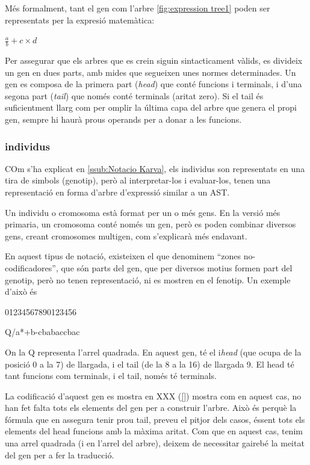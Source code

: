 \documentclass[titlepage,a4paper,12pt]{book}
\begin{document}
Més formalment, tant el gen com l'arbre \ref{fig:expression tree1} poden ser
representats per la expresió matemàtica:

	$\frac{a}{b}+c \times d$

Per assegurar que els arbres que es crein siguin sintacticament vàlids,
es divideix un gen en dues parts, amb mides que segueixen unes normes
determinades.  Un gen es composa de la primera part (\emph{head}) que conté
funcions i terminals, i d'una segona part (\emph{tail}) que només conté
terminals (aritat zero). Si el tail és suficientment llarg com per omplir la
última capa del arbre que genera el propi gen, sempre hi haurà prous operands
per a donar a les funcions.


\subsubsection{individus} %
\label{issub:individus}

COm s'ha explicat en \ref{ssub:Notacio Karva}, els individus son representats en
una tira de simbols (genotip), però al interpretar-los i evaluar-los, tenen una
representació en forma d'arbre d'expressió similar a un AST.

Un individu o cromosoma està format per un o més gens.  En la versió més
primaria, un cromosoma conté només un gen, però es poden combinar diversos gens,
creant cromosomes multigen, com s'explicarà més endavant.

En aquest tipus de notació, existeixen el que denominem ``zones
no-codificadores'', que són parts del gen, que per diversos motius formen part
del genotip, però no tenen representació, ni es mostren en el fenotip.  Un
exemple d'això és


01234567890123456 	 

Q/a*+b-cbabaccbac
	
On la Q representa l'arrel quadrada.  En aquest gen, té el i\emph{head} (que ocupa
de la posició 0 a la 7) de llargada, i el tail (de la 8 a la 16) de llargada 9.
El head té tant funcions com terminals, i el tail, només té terminals.

La codificació d'aquest gen es mostra en XXX (\ref{}) mostra com en aquest cas,
no han fet falta tots els elements del gen per a construir l'arbre.  Això és
perquè la fórmula que en assegura tenir prou tail, preveu el pitjor dels casos,
éssent tots els elements del head funcions amb la màxima aritat.  Com que en
aquest cas, tenim una arrel quadrada (i en l'arrel del arbre), deixem de
necessitar gairebé la meitat del gen per a fer la traducció.
\end{document}
